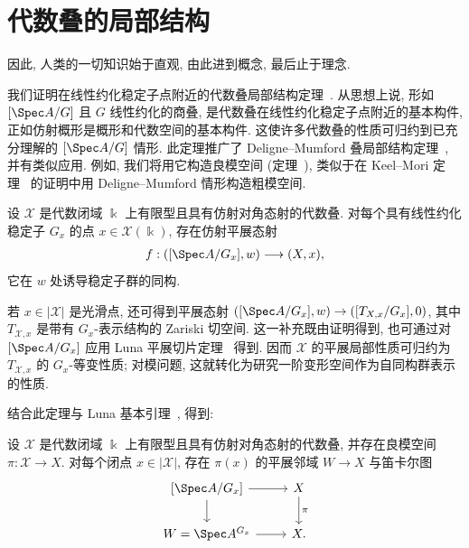 \section{代数叠的局部结构}\label{src:7.7}
\begin{epigraph}
因此, 人类的一切知识始于直观, 由此进到概念, 最后止于理念.
\end{epigraph}
我们证明在线性约化稳定子点附近的代数叠局部结构定理~. 从思想上说, 形如 $[\Spec A/G]$ 且 $G$ 线性约化的商叠, 是代数叠在线性约化稳定子点附近的基本构件, 正如仿射概形是概形和代数空间的基本构件. 这使许多代数叠的性质可归约到已充分理解的 $[\Spec A/G]$ 情形. 此定理推广了 Deligne--Mumford 叠局部结构定理~, 并有类似应用. 例如, 我们将用它构造良模空间 (定理~), 类似于在 Keel--Mori 定理~ 的证明中用 Deligne--Mumford 情形构造粗模空间.
\begin{theorem}[代数叠的局部结构定理]\label{src:7.7.1}
设 $\mathcal X$ 是代数闭域 $\Bbbk$ 上有限型且具有仿射对角态射的代数叠. 对每个具有线性约化稳定子 $G_x$ 的点 $x\in\mathcal X(\Bbbk)$, 存在仿射平展态射
\begin{align*}
f:([\Spec A/G_x],w)\longrightarrow(\mathcal X,x),
\end{align*}
它在 $w$ 处诱导稳定子群的同构.
\end{theorem}
\begin{remark}\label{src:7.7.2}
若 $x\in|\mathcal X|$ 是光滑点, 还可得到平展态射 $([\Spec A/G_x],w)\to([T_{\mathcal X,x}/G_x],0)$, 其中 $T_{\mathcal X,x}$ 是带有 $G_x$-表示结构的 Zariski 切空间. 这一补充既由证明得到, 也可通过对 $[\Spec A/G_x]$ 应用 Luna 平展切片定理~ 得到. 因而 $\mathcal X$ 的平展局部性质可归约为 $T_{\mathcal X,x}$ 的 $G_x$-等变性质; 对模问题, 这就转化为研究一阶变形空间作为自同构群表示的性质.
\end{remark}
结合此定理与 Luna 基本引理~, 得到:
\begin{corollary}[良模空间的局部结构]\label{src:7.7.3}
设 $\mathcal X$ 是代数闭域 $\Bbbk$ 上有限型且具有仿射对角态射的代数叠, 并存在良模空间 $\pi:\mathcal X\to X$. 对每个闭点 $x\in|\mathcal X|$, 存在 $\pi(x)$ 的平展邻域 $W\to X$ 与笛卡尔图
\begin{align*}
\begin{tikzcd}[ampersand replacement=\&]
{[\Spec A/G_x]}\arrow[r]\arrow[d]\&\mathcal X\arrow[d,"{\pi}"]\\
W=\Spec A^{G_x}\arrow[r]\&X.
\end{tikzcd}
\end{align*}
\end{corollary}
